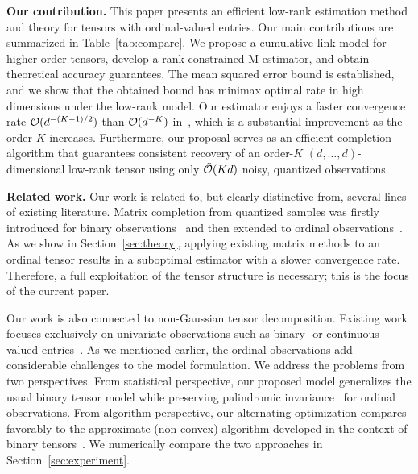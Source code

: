 \documentclass[11pt]{article}
\theoremstyle{plain}
\theoremstyle{definition}
\begin{document}
{\bf Our contribution.} This paper presents an efficient low-rank estimation method and theory for tensors with ordinal-valued entries. Our main contributions are summarized in Table~\ref{tab:compare}. We propose a cumulative link model for higher-order tensors, develop a rank-constrained M-estimator, and obtain theoretical accuracy guarantees. The mean squared error bound is established, and we show that the obtained bound has minimax optimal rate in high dimensions under the low-rank model. Our estimator enjoys a faster convergence rate $\mathcal{O}(d^{-(K-1)/2})$ than $\mathcal{O}(d^{-K})$ in~\citet{ghadermarzy2018learning}, which is a substantial improvement as the order $K$ increases. Furthermore, our proposal serves as an efficient completion algorithm that guarantees consistent recovery of an order-$K$ $(d,\ldots,d)$-dimensional low-rank tensor using only $\tilde {\mathcal{O}}(Kd)$ noisy, quantized observations.

{\bf Related work.} Our work is related to, but clearly distinctive from, several lines of existing literature. Matrix completion from quantized samples was firstly introduced for binary observations~\cite{cai2013max,davenport2014,bhaskar20151} and then extended to ordinal observations~\cite{bhaskar2016probabilistic}. As we show in Section~\ref{sec:theory}, applying existing matrix methods to an ordinal tensor results in a suboptimal estimator with a slower convergence rate. Therefore, a full exploitation of the tensor structure is necessary; this is the focus of the current paper.

Our work is also connected to non-Gaussian tensor decomposition. Existing work focuses exclusively on univariate observations such as binary- or continuous-valued entries~\citep{wang2018learning,hong2018generalized,ghadermarzy2018learning}. As we mentioned earlier, the ordinal observations add considerable challenges to the model formulation. We address the problems from two perspectives. From statistical perspective, our proposed model generalizes the usual binary tensor model while preserving palindromic invariance~\cite{mccullagh1980regression} for ordinal observations. From algorithm perspective, our alternating optimization compares favorably to the approximate (non-convex) algorithm developed in the context of binary tensors~\cite{ghadermarzy2018learning}. We numerically compare the two approaches in Section~\ref{sec:experiment}.
\end{document}
